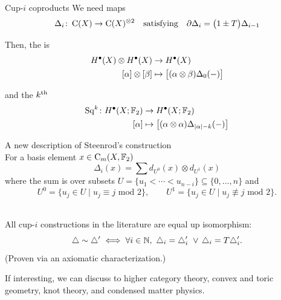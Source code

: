 \begin{frame}{Cup-$i$ coproducts}
	\pause
	We need  maps
	\[
	\Delta_i \colon \operatorname{C}(X) \to \operatorname{C}(X)^{\otimes 2}
	\quad \text{satisfying} \quad
	\partial \Delta_{i} = \big(1 \pm T \big) \Delta_{i-1}
	\]

	\pause\bigskip\smallskip
	Then, the  is
	\[
	\begin{split}
		H^\bullet(X) \otimes H^\bullet(X) &\to H^\bullet(X) \\
		[\alpha] \otimes [\beta] &\mapsto \big[ (\alpha \otimes \beta) \Delta_0(-) \big]
	\end{split}
	\]

	\smallskip\pause
	and the $k^{\mathrm{th}}$ 
	\[
	\begin{split}
		\operatorname{Sq}^k \colon H^\bullet(X; {\mathbb{F}_2}) &\to H^\bullet(X; {\mathbb{F}_2}) \\
		[\alpha] &\mapsto \big[ (\alpha \otimes \alpha) \Delta_{\lvert\alpha\rvert-k}(-) \big]
	\end{split}
	\]
\end{frame}

\begin{frame}{A new description of Steenrod's construction}
	\pause
	 \\
	For a basis element $x \in \operatorname{C}_m(X, {\mathbb{F}_2})$
	\[
	\textstyle \Delta_i(x) = \sum d_{U^0}(x) \otimes d_{U^1}(x)
	\]
	where the sum is over subsets $U = \{u_1 < \cdots < u_{n-i}\} \subseteq \{0, \dots, n\}$ and
	\begin{equation*} \label{e:partition subsets}
		U^0 = \{u_j \in U\mid u_j \equiv j \text{ mod } 2\}, \qquad
		U^1 = \{u_j \in U\mid u_j \not\equiv j \text{ mod } 2\}.
	\end{equation*}

	\pause\medskip
	 \\
	All cup-$i$ constructions in the literature are equal up isomorphism:
	\vskip -7.5pt
	\[
	\triangle \sim \triangle^\prime \iff \forall i \in \mathbb{N}, \ \triangle_i = \triangle_i^\prime \ \vee \, \triangle_i = T \triangle_i^\prime.
	\]
	\vskip -3pt
	(Proven via an axiomatic characterization.)

	\pause\bigskip
	If interesting, we can discuss  to
	higher category theory, convex and toric geometry, knot theory, and condensed matter physics.
\end{frame}

